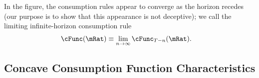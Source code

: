 \documentclass[BufferStockTheory]{subfiles}
\begin{document}
\hypertarget{Symbols}{}



\providecommand{\figName}{Convergence-of-the-Consumption-Rules} %
\providecommand{\figFile}{cFuncsConverge} %
\hypertarget{\figFile}{}
\hypertarget{\figName}{}

In the figure, the consumption rules appear to converge as the horizon
recedes (our purpose is to show that this appearance is not deceptive); we
call the limiting infinite-horizon consumption rule
\begin{align}
  \cFunc(\mRat)  & \equiv  \lim_{n \rightarrow \infty} \cFunc_{T-n}(\mRat).
\end{align}

\hypertarget{Concave-Consumption-Function-Characteristics}{}
\subsection{Concave Consumption Function Characteristics}\label{sec:cExists}
\end{document}
